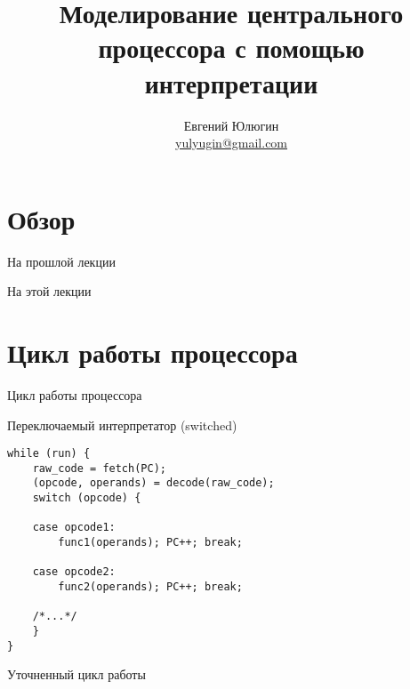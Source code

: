

\title{Моделирование центрального процессора с помощью интерпретации}
\author[Евгений Юлюгин]{Евгений Юлюгин \\ \small{\href{mailto:yulyugin@gmail.com}{yulyugin@gmail.com}}}



\begin{frame}
\titlepage
\end{frame}

\section*{Обзор}

\begin{frame}{На прошлой лекции}
\end{frame}

\begin{frame}{На этой лекции}
\tableofcontents
\end{frame} 


\section{Цикл работы процессора}

\begin{frame}{Цикл работы процессора}
\centering
{}
\end{frame}

\begin{frame}[fragile]{Переключаемый интерпретатор (switched)}
\begin{lstlisting}
while (run) {
    raw_code = fetch(PC);
    (opcode, operands) = decode(raw_code);
    switch (opcode) {

    case opcode1:
        func1(operands); PC++; break;

    case opcode2:
        func2(operands); PC++; break;

    /*...*/
    }
}
\end{lstlisting}
\end{frame}

\begin{frame}{Уточненный цикл работы}
\centering
{}
\end{frame}

